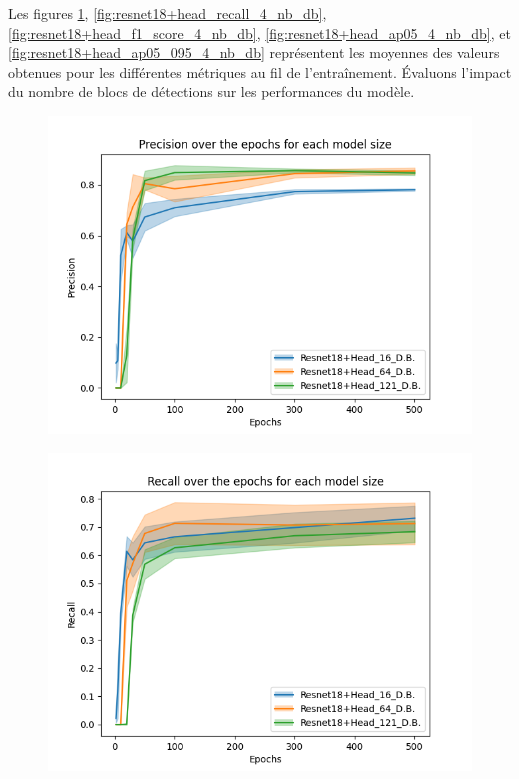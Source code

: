 Les figures \ref{fig:resnet18+head_precision_4_nb_db}, \ref{fig:resnet18+head_recall_4_nb_db}, \ref{fig:resnet18+head_f1_score_4_nb_db}, \ref{fig:resnet18+head_ap05_4_nb_db}, et \ref{fig:resnet18+head_ap05_095_4_nb_db} représentent les moyennes des valeurs obtenues pour les différentes métriques au fil de l'entraînement. Évaluons l'impact du nombre de blocs de détections sur les performances du modèle.

\begin{figure}[!htbp]
    \centering
    \begin{minipage}[t]{.5\textwidth}%
      \centering
      \includegraphics[width=1.1\linewidth]{Figures/results/resnet18+head/resnet18+head_precision_4_nb_db.png}
      \label{fig:resnet18+head_precision_4_nb_db}
    \end{minipage}%
    \begin{minipage}[t]{.5\textwidth}%
      \centering
      \includegraphics[width=1.1\linewidth ]{Figures/results/resnet18+head/resnet18+head_recall_4_nb_db.png}

\end{minipage}
\end{figure}
